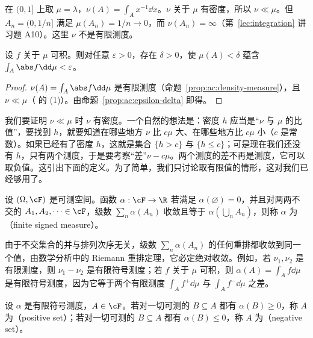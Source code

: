 \begin{example}[有限性不能去掉]
在 $(0,1]$ 上取 $\mu=\lambda$，$\nu(A)=\int_Ax^{-1}\dd x$。$\nu$ 关于 $\mu$ 有密度，所以 $\nu\ll\mu$。但 $A_n=(0,1/n]$ 满足 $\mu(A_n)=1/n\to0$，而 $\nu(A_n)=\infty$（第~\ref{lec:integration} 讲习题 A10）。这里 $\nu$ 不是有限测度。
\end{example}

\begin{corollary}[积分的绝对连续性]\label{cor:ac:integral-ac}
设 $f$ 关于 $\mu$ 可积。则对任意 $\varepsilon>0$，存在 $\delta>0$，使 $\mu(A)<\delta$ 蕴含 $\int_A\abs f\dd\mu<\varepsilon$。
\end{corollary}
\begin{proof}
$\nu(A)=\int_A\abs f\dd\mu$ 是有限测度（命题~\ref{prop:ac:density-measure}），且 $\nu\ll\mu$（ 的 (1)）。由命题~\ref{prop:ac:epsilon-delta} 即得。
\end{proof}


我们要证明 $\nu\ll\mu$ 时 $\nu$ 有密度。一个自然的想法是：密度 $h$ 应当是“$\nu$ 与 $\mu$ 的比值”，要找到 $h$，就要知道在哪些地方 $\nu$ 比 $c\mu$ 大、在哪些地方比 $c\mu$ 小（$c$ 是常数）。如果已经有了密度 $h$，这就是集合 $\{h>c\}$ 与 $\{h\leqslant c\}$；可是现在我们还没有 $h$，只有两个测度，于是要考察“差”$\nu-c\mu$。两个测度的差不再是测度，它可以取负值。这引出下面的定义。为了简单，我们只讨论取有限值的情形，这对我们已经够用了。

\begin{definition}[有限符号测度]\label{def:ac:signed}
设 $(\Omega,\cF)$ 是可测空间。函数 $\alpha:\cF\to\R$ 若满足 $\alpha(\varnothing)=0$，并且对两两不交的 $A_1,A_2,\dots\in\cF$，级数 $\sum_n\alpha(A_n)$ 收敛且等于 $\alpha(\bigcup_nA_n)$，则称 $\alpha$ 为（finite signed measure）。
\end{definition}

由于不交集合的并与排列次序无关，级数 $\sum_n\alpha(A_n)$ 的任何重排都收敛到同一个值，由数学分析中的 Riemann 重排定理，它必定绝对收敛。例如，若 $\nu_1,\nu_2$ 是有限测度，则 $\nu_1-\nu_2$ 是有限符号测度；若 $f$ 关于 $\mu$ 可积，则 $\alpha(A)=\int_Af\dd\mu$ 是有限符号测度，因为它等于两个有限测度 $\int_Af^+\dd\mu$ 与 $\int_Af^-\dd\mu$ 之差。

\begin{definition}[正集，负集]
设 $\alpha$ 是有限符号测度，$A\in\cF$。若对一切可测的 $B\subseteq A$ 都有 $\alpha(B)\geqslant0$，称 $A$ 为（positive set）；若对一切可测的 $B\subseteq A$ 都有 $\alpha(B)\leqslant0$，称 $A$ 为（negative set）。
\end{definition}


